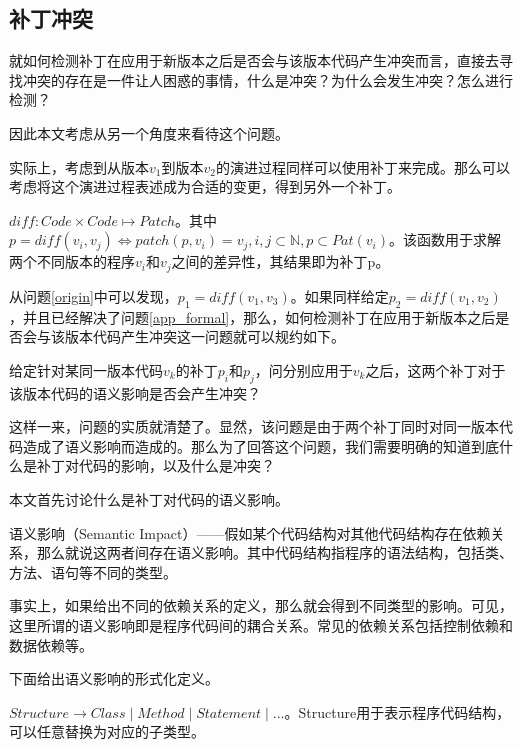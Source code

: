 \subsection{补丁冲突}

就如何检测补丁在应用于新版本之后是否会与该版本代码产生冲突而言，直接去寻找冲突的存在是一件让人困惑的事情，什么是冲突？为什么会发生冲突？怎么进行检测？

因此本文考虑从另一个角度来看待这个问题。

实际上，考虑到从版本$v_1$到版本$v_2$的演进过程同样可以使用补丁来完成。那么可以考虑将这个演进过程表述成为合适的变更，得到另外一个补丁。

\begin{definition}
	\label {define_diff}
	$diff : Code \times Code \mapsto Patch$。其中$p = diff(v_i,v_j) \iff patch(p,v_i) = v_j,i,j \subset \mathbb{N},p \subset Pat(v_i)$。该函数用于求解两个不同版本的程序$v_i$和$v_j$之间的差异性，其结果即为补丁p。
\end{definition}

从问题\ref {origin}中可以发现，$p_{1} = diff(v_{1},v_{3})$。如果同样给定$p_{2} = diff(v_{1},v_{2})$，并且已经解决了问题\ref {app_formal}，那么，如何检测补丁在应用于新版本之后是否会与该版本代码产生冲突这一问题就可以规约如下。

\begin{problem}
	\label {compatible}
	给定针对某同一版本代码$v_k$的补丁$p_i$和$p_j$，问分别应用于$v_k$之后，这两个补丁对于该版本代码的语义影响是否会产生冲突？
\end{problem}

这样一来，问题的实质就清楚了。显然，该问题是由于两个补丁同时对同一版本代码造成了语义影响而造成的。那么为了回答这个问题，我们需要明确的知道到底什么是补丁对代码的影响，以及什么是冲突？

本文首先讨论什么是补丁对代码的语义影响。

\begin{definition}
	语义影响（Semantic Impact）——假如某个代码结构对其他代码结构存在依赖关系，那么就说这两者间存在语义影响。其中代码结构指程序的语法结构，包括类、方法、语句等不同的类型。
\end{definition}

事实上，如果给出不同的依赖关系的定义，那么就会得到不同类型的影响。可见，这里所谓的语义影响即是程序代码间的耦合关系。常见的依赖关系包括控制依赖和数据依赖等。

下面给出语义影响的形式化定义。

\begin{definition}
	$Structure \to Class \mid Method \mid Statement \mid ...$。Structure用于表示程序代码结构，可以任意替换为对应的子类型。
\end{definition}

